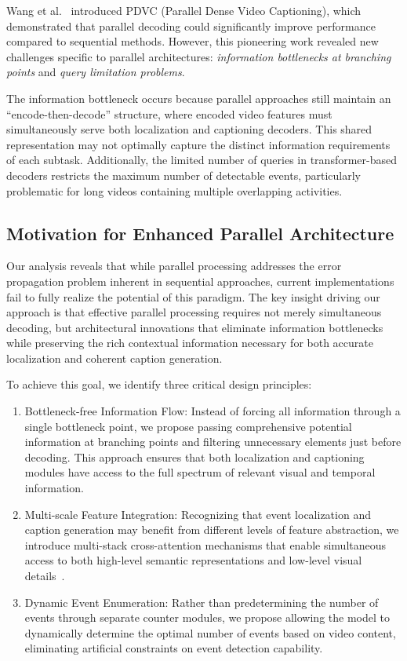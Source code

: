 Wang et al.~\cite{wang2021end} introduced PDVC (Parallel Dense Video Captioning), which demonstrated that parallel decoding could significantly improve performance compared to sequential methods.
However, this pioneering work revealed new challenges specific to parallel architectures: \textit{information bottlenecks at branching points} and \textit{query limitation problems}.

The information bottleneck occurs because parallel approaches still maintain an ``encode-then-decode'' structure, where encoded video features must simultaneously serve both localization and captioning decoders.
This shared representation may not optimally capture the distinct information requirements of each subtask.
Additionally, the limited number of queries in transformer-based decoders restricts the maximum number of detectable events, particularly problematic for long videos containing multiple overlapping activities.

\subsection{Motivation for Enhanced Parallel Architecture}
Our analysis reveals that while parallel processing addresses the error propagation problem inherent in sequential approaches, current implementations fail to fully realize the potential of this paradigm.
The key insight driving our approach is that effective parallel processing requires not merely simultaneous decoding, but architectural innovations that eliminate information bottlenecks while preserving the rich contextual information necessary for both accurate localization and coherent caption generation.

To achieve this goal, we identify three critical design principles:
\begin{enumerate}
  \item Bottleneck-free Information Flow: Instead of forcing all information through a single bottleneck point, we propose passing comprehensive potential information at branching points and filtering unnecessary elements just before decoding. This approach ensures that both localization and captioning modules have access to the full spectrum of relevant visual and temporal information.
  \item Multi-scale Feature Integration: Recognizing that event localization and caption generation may benefit from different levels of feature abstraction, we introduce multi-stack cross-attention mechanisms that enable simultaneous access to both high-level semantic representations and low-level visual details~\cite{vaswani2017attention}.
  \item Dynamic Event Enumeration: Rather than predetermining the number of events through separate counter modules, we propose allowing the model to dynamically determine the optimal number of events based on video content, eliminating artificial constraints on event detection capability.
\end{enumerate}


